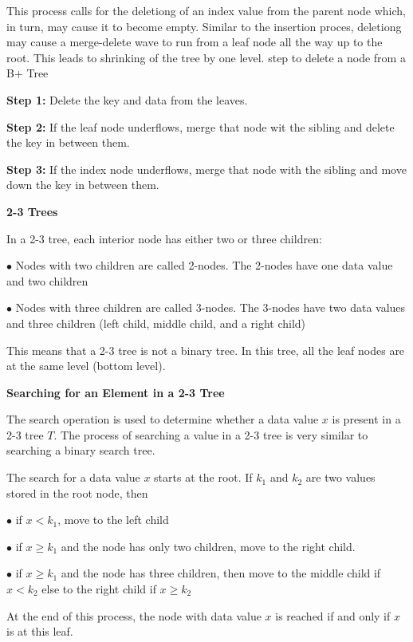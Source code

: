 \vskip 1mm
This process calls for the deletiong of an index value from the parent node which, in turn, may cause it to become empty. Similar to the insertion proces, deletiong may cause a merge-delete wave to run from a leaf node all the way up to the root. This leads to shrinking of the tree by one level. step to delete a node from a B+ Tree

\vskip 1mm
{\bf Step 1:} Delete the key and data from the leaves.

\vskip 3mm
{\bf Step 2:} If the leaf node underflows, merge that node wit the sibling and delete the key in between them.

\vskip 3mm
{\bf Step 3:} If the index node underflows, merge that node with the sibling and move down the key in between them.

\filbreak
\vskip 1cm
{\bf 2-3 Trees}

\vskip 1mm
In a 2-3 tree, each interior node has either two or three children:

\vskip 1mm
\qquad$\bullet$ Nodes with two children are called 2-nodes. The 2-nodes have one data value and two children

\vskip 3mm
\qquad$\bullet$ Nodes with three children are called 3-nodes. The 3-nodes have two data values and three children (left child, middle child, and a right child)

\vskip 3mm
This means that a 2-3 tree is not a binary tree. In this tree, all the leaf nodes are at the same level (bottom level).

\vskip 1cm
{\bf Searching for an Element in a 2-3 Tree}

\vskip 1mm
The search operation is used to determine whether a data value $x$ is present in a 2-3 tree $T$. The process of searching a value in a 2-3 tree is very similar to searching a binary search tree.

\vskip 1mm
The search for a data value $x$ starts at the root. If $k_1$ and $k_2$ are two values stored in the root node, then

\vskip 1mm
\qquad$\bullet$ if $x<k_1$, move to the left child

\vskip 3mm
\qquad$\bullet$ if $x\geq k_1$ and the node has only two children, move to the right child.

\vskip 3mm
\qquad$\bullet$ if $x\geq k_1$ and the node has three children, then move to the middle child if $x<k_2$ else to the right child if $x\geq k_2$

\vskip 1mm
At the end of this process, the node with data value $x$ is reached if and only if $x$ is at this leaf.

